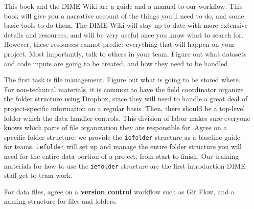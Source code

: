 This book and the DIME Wiki are a guide and a manual to our workflow.
This book will give you a narrative account of the things you'll need to do,
and some basic tools to do them.
The DIME Wiki will stay up to date with more extensive details and resources,
and will be very useful once you know what to search for.
However, these resources cannot predict everything that will happen on your project.
Most importantly, talk to others in your team.
Figure out what datasets and code inputs are going to be created,
and how they need to be handled.

The first task is file management.
Figure out what is going to be stored where.
For non-technical materials,
it is common to have the field coordinator organize
the folder structure using Dropbox,
since they will need to handle a great deal of
project-specific information on a regular basis.
Then, there should be a top-level folder which the data handler controls.
This division of labor makes sure everyone knows
which parts of file organization they are responsible for.
Agree on a specific folder structure: we provide the
\texttt{iefolder}
structure as a baseline guide for teams.
\texttt{iefolder} will set up and manage the entire folder structure
you will need for the entire data portion of a project, from start to finish.
Our training materials for how to use the \texttt{iefolder} structure
are the first introduction DIME staff get to team work.

For data files, agree on a \textbf{version control}\cite{blischak2016quick} workflow such as
Git Flow,
and a naming structure for files and folders.
